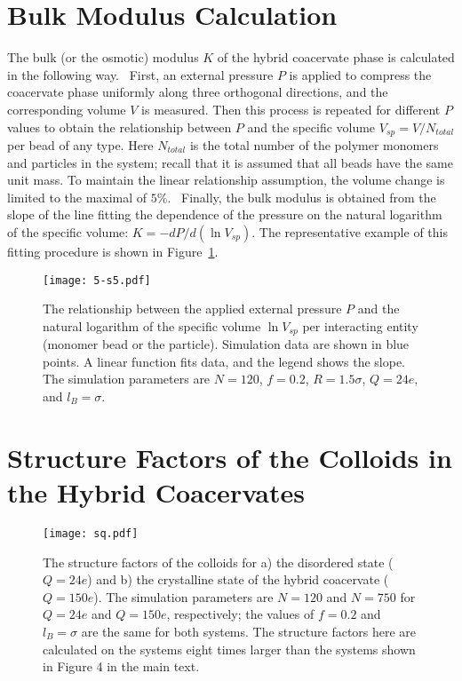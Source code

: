 \documentclass[journal=mamobx, manuscript=article]{achemso}
\begin{document}
\newpage

\section{Bulk Modulus Calculation}
\label{subsection:bulk}

The bulk (or the osmotic) modulus $K$ of the hybrid coacervate phase is calculated in the following way.~\cite{wu2019bulk} First, an external pressure $P$ is applied to compress the coacervate phase uniformly along three orthogonal directions, and the corresponding volume $V$ is measured. Then this process is repeated for different $P$ values to obtain the relationship between $P$ and the specific volume $V_{sp} = V/N_{total}$ per bead of any type. Here $N_{total}$ is the total number of the polymer monomers and particles in the system; recall that it is assumed that all beads have the same unit mass. To maintain the linear relationship assumption, the volume change is limited to the maximal of $5\%$.~\cite{wu2019bulk} Finally, the bulk modulus is obtained from the slope of the line fitting the dependence of the pressure on the natural logarithm of the specific volume: $K = -{dP} / {d(\ln V_{sp})}$. The representative example of this fitting procedure is shown in Figure~\ref{fig:bulk-fit}.

\begin{figure}[ht]
\centering
\texttt{[image: 5-s5.pdf]}
\caption{The relationship between the applied external pressure $P$ and the natural logarithm of the specific volume $\ln V_{sp}$ per interacting entity (monomer bead or the particle). Simulation data are shown in blue points. A linear function fits data, and the legend shows the slope. The simulation parameters are $N = 120$, $f = 0.2$, $R = 1.5\sigma$, $Q = 24e$, and $l_{B} = \sigma$.}
\label{fig:bulk-fit}
\end{figure}

\newpage
\section{Structure Factors of the Colloids in the Hybrid Coacervates}
\label{subsection:sq-SI}

\begin{figure}[ht]
\centering
\texttt{[image: sq.pdf]}
\caption{The structure factors of the colloids for a) the disordered state ($Q = 24e$) and b) the crystalline state of the hybrid coacervate ($Q=150e$). The simulation parameters are $N = 120$ and $N=750$ for $Q = 24e$ and $Q=150e$, respectively; the values of $f = 0.2$ and $l_{B} = \sigma$ are the same for both systems. The structure factors here are calculated on the systems eight times larger than the systems shown in Figure 4 in the main text.}
\label{fig:d-SI}
\end{figure}


\end{document}
